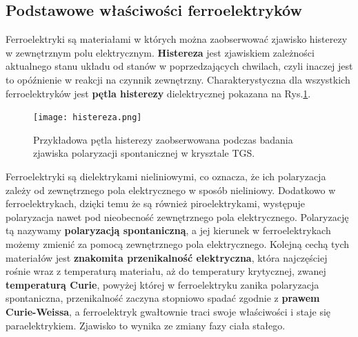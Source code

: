 \documentclass{article}
\begin{document}
\subsection{Podstawowe właściwości ferroelektryków}
Ferroelektryki są materiałami w których można zaobserwować zjawisko histerezy w zewnętrznym polu elektrycznym\cite{histereza}. \textbf{Histereza} jest zjawiskiem zależności aktualnego stanu układu od stanów w poprzedzających chwilach, czyli inaczej jest to opóźnienie w reakcji na czynnik zewnętrzny. Charakterystyczna dla wszystkich ferroelektryków jest \textbf{pętla histerezy} dielektrycznej pokazana na Rys.\ref{fig:histereza}.

\begin{figure}[!h]
	\centering
	\texttt{[image: histereza.png]}
	\caption{Przykładowa pętla histerezy zaobserwowana podczas badania zjawiska polaryzacji spontanicznej w krysztale TGS.}
	\label{fig:histereza}
\end{figure}

Ferroelektryki są dielektrykami nieliniowymi, co oznacza, że ich polaryzacja zależy od zewnętrznego pola elektrycznego w sposób nieliniowy. Dodatkowo w ferroelektrykach, dzięki temu że są również piroelektrykami, występuje polaryzacja nawet pod nieobecność zewnętrznego pola elektrycznego. Polaryzację tą nazywamy \textbf{polaryzacją spontaniczną}, a jej kierunek w ferroelektrykach możemy zmienić za pomocą zewnętrznego pola elektrycznego. Kolejną cechą tych materiałów jest \textbf{znakomita przenikalność elektryczna}, która najczęściej rośnie wraz z temperaturą materiału, aż do temperatury krytycznej, zwanej \textbf{temperaturą Curie}, powyżej której w ferroelektryku zanika polaryzacja spontaniczna, przenikalność zaczyna stopniowo spadać zgodnie z \textbf{prawem Curie-Weissa}\cite{krajewski}, a ferroelektryk gwałtownie traci swoje właściwości i staje się paraelektrykiem. Zjawisko to wynika ze zmiany fazy ciała stałego.
\end{document}
